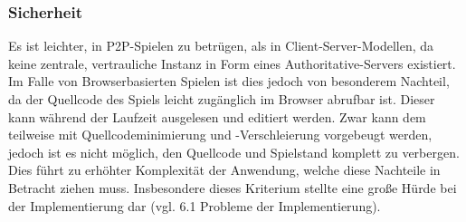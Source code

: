 \subsubsection{Sicherheit}
Es ist leichter, in \acs{P2P}-Spielen zu betrügen, als in Client-Server-Modellen, da keine zentrale, vertrauliche Instanz in Form eines Authoritative-Servers existiert. Im Falle von Browserbasierten Spielen ist dies jedoch von besonderem Nachteil, da der Quellcode des Spiels leicht zugänglich im Browser abrufbar ist. Dieser kann während der Laufzeit ausgelesen und editiert werden. Zwar kann dem teilweise mit Quellcodeminimierung und -Verschleierung vorgebeugt werden, jedoch ist es nicht möglich, den Quellcode und Spielstand komplett zu verbergen. Dies führt zu erhöhter Komplexität der Anwendung, welche diese Nachteile in Betracht ziehen muss. Insbesondere dieses Kriterium stellte eine große Hürde bei der Implementierung dar (vgl. 6.1 Probleme der Implementierung).





